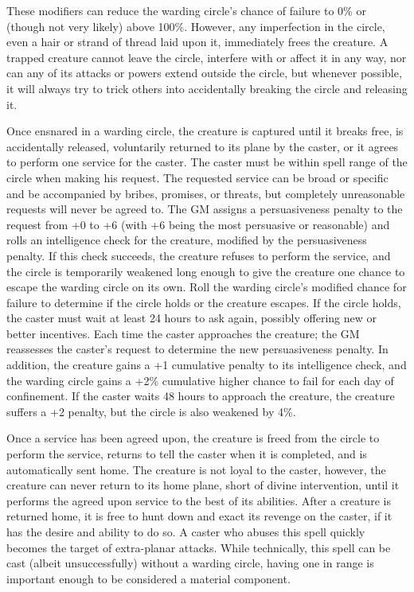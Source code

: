 \begin{multicols}{2}
These modifiers can reduce the warding circle's chance of failure to 0\% or (though not very likely) above 100\%.  However, any imperfection in the circle, even a hair or strand of thread laid upon it, immediately frees the creature.  A trapped creature cannot leave the circle, interfere with or affect it in any way, nor can any of its attacks or powers extend outside the circle, but whenever possible, it will always try to trick others into accidentally breaking the circle and releasing it.

Once ensnared in a warding circle, the creature is captured until it breaks free, is accidentally released, voluntarily returned to its plane by the caster, or it agrees to perform one service for the caster.  The caster must be within spell range of the circle when making his request.  The requested service can be broad or specific and be accompanied by bribes, promises, or threats, but completely unreasonable requests will never be agreed to.  The GM assigns a persuasiveness penalty to the request from +0 to +6 (with +6 being the most persuasive or reasonable) and rolls an intelligence check for the creature, modified by the persuasiveness penalty.  If this check succeeds, the creature refuses to perform the service, and the circle is temporarily weakened long enough to give the creature one chance to escape the warding circle on its own.  Roll the warding circle's modified chance for failure to determine if the circle holds or the creature escapes.  If the circle holds, the caster must wait at least 24 hours to ask again, possibly offering new or better incentives.  Each time the caster approaches the creature; the GM reassesses the caster's request to determine the new persuasiveness penalty.  In addition, the creature gains a +1 cumulative penalty to its intelligence check, and the warding circle gains a +2\% cumulative higher chance to fail for each day of confinement.  If the caster waits 48 hours to approach the creature, the creature suffers a +2 penalty, but the circle is also weakened by 4\%.  

Once a service has been agreed upon, the creature is freed from the circle to perform the service, returns to tell the caster when it is completed, and is automatically sent home.  The creature is not loyal to the caster, however, the creature can never return to its home plane, short of divine intervention, until it performs the agreed upon service to the best of its abilities.  After a creature is returned home, it is free to hunt down and exact its revenge on the caster, if it has the desire and ability to do so.  A caster who abuses this spell quickly becomes the target of extra-planar attacks.  While technically, this spell can be cast (albeit unsuccessfully) without a warding circle, having one in range is important enough to be considered a material component.


\end{multicols}

